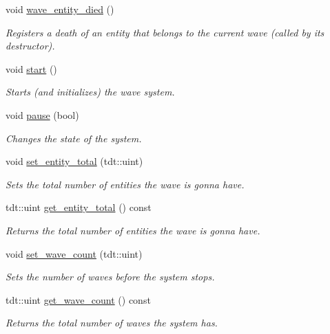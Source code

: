 \begin{DoxyCompactItemize}
void \hyperlink{class_wave_system_aa14e5872f96047435b548954fbabdcd6}{wave\+\_\+entity\+\_\+died} ()
\begin{DoxyCompactList}\small\item\em Registers a death of an entity that belongs to the current wave (called by it\textquotesingle{}s destructor). \end{DoxyCompactList}\item 
void \hyperlink{class_wave_system_a89b2ca21abdcb03249b30f11e07bedaa}{start} ()
\begin{DoxyCompactList}\small\item\em Starts (and initializes) the wave system. \end{DoxyCompactList}\item 
void \hyperlink{class_wave_system_a4e92e26fc773d507bf7cb7d75d4c4ddd}{pause} (bool)
\begin{DoxyCompactList}\small\item\em Changes the state of the system. \end{DoxyCompactList}\item 
void \hyperlink{class_wave_system_a4ed4f0b470bbeff062535a7a7b0d26a5}{set\+\_\+entity\+\_\+total} (tdt\+::uint)
\begin{DoxyCompactList}\small\item\em Sets the total number of entities the wave is gonna have. \end{DoxyCompactList}\item 
tdt\+::uint \hyperlink{class_wave_system_aa563d934ce6552ff5184d8deadd1a2c2}{get\+\_\+entity\+\_\+total} () const 
\begin{DoxyCompactList}\small\item\em Returns the total number of entities the wave is gonna have. \end{DoxyCompactList}\item 
void \hyperlink{class_wave_system_a78d88369731c166b2769bde431593e08}{set\+\_\+wave\+\_\+count} (tdt\+::uint)
\begin{DoxyCompactList}\small\item\em Sets the number of waves before the system stops. \end{DoxyCompactList}\item 
tdt\+::uint \hyperlink{class_wave_system_af0ca06c6dda78b2ad0a85ce71f3c60a3}{get\+\_\+wave\+\_\+count} () const 
\begin{DoxyCompactList}\small\item\em Returns the total number of waves the system has. \end{DoxyCompactList}\item 

\end{DoxyCompactItemize}
